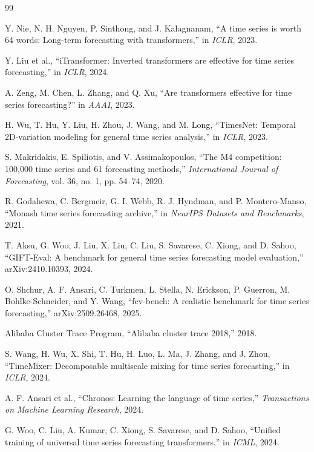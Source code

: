 \documentclass[conference]{IEEEtran}
\begin{document}

\begin{thebibliography}{99}

Y. Nie, N. H. Nguyen, P. Sinthong, and J. Kalagnanam, ``A time series is worth 64 words: Long-term forecasting with transformers,'' in \emph{ICLR}, 2023.

Y. Liu et al., ``iTransformer: Inverted transformers are effective for time series forecasting,'' in \emph{ICLR}, 2024.

A. Zeng, M. Chen, L. Zhang, and Q. Xu, ``Are transformers effective for time series forecasting?'' in \emph{AAAI}, 2023.

H. Wu, T. Hu, Y. Liu, H. Zhou, J. Wang, and M. Long, ``TimesNet: Temporal 2D-variation modeling for general time series analysis,'' in \emph{ICLR}, 2023.

S. Makridakis, E. Spiliotis, and V. Assimakopoulos, ``The M4 competition: 100,000 time series and 61 forecasting methods,'' \emph{International Journal of Forecasting}, vol. 36, no. 1, pp. 54--74, 2020.

R. Godahewa, C. Bergmeir, G. I. Webb, R. J. Hyndman, and P. Montero-Manso, ``Monash time series forecasting archive,'' in \emph{NeurIPS Datasets and Benchmarks}, 2021.

T. Aksu, G. Woo, J. Liu, X. Liu, C. Liu, S. Savarese, C. Xiong, and D. Sahoo, ``GIFT-Eval: A benchmark for general time series forecasting model evaluation,'' arXiv:2410.10393, 2024.

O. Shchur, A. F. Ansari, C. Turkmen, L. Stella, N. Erickson, P. Guerron, M. Bohlke-Schneider, and Y. Wang, ``fev-bench: A realistic benchmark for time series forecasting,'' arXiv:2509.26468, 2025.

Alibaba Cluster Trace Program, ``Alibaba cluster trace 2018,'' 2018.

S. Wang, H. Wu, X. Shi, T. Hu, H. Luo, L. Ma, J. Zhang, and J. Zhou, ``TimeMixer: Decomposable multiscale mixing for time series forecasting,'' in \emph{ICLR}, 2024.

A. F. Ansari et al., ``Chronos: Learning the language of time series,'' \emph{Transactions on Machine Learning Research}, 2024.

G. Woo, C. Liu, A. Kumar, C. Xiong, S. Savarese, and D. Sahoo, ``Unified training of universal time series forecasting transformers,'' in \emph{ICML}, 2024.


\end{thebibliography}
\end{document}
